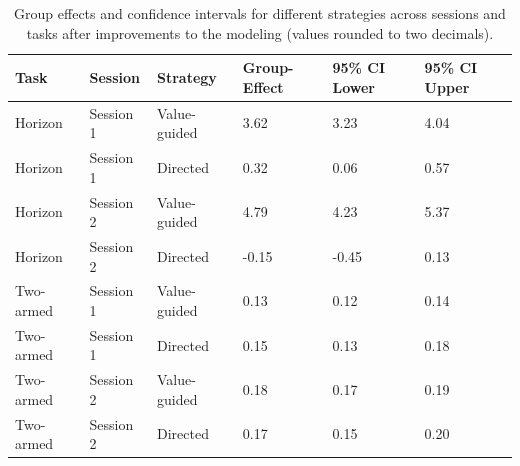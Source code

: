\documentclass[fleqn,10pt]{wlscirep}
\begin{document}
\begin{table}[ht]
\centering
\begin{tabular}{|l|l|l|l|l|l|}
\hline
\textbf{Task} & \textbf{Session} & \textbf{Strategy} & \textbf{Group-Effect} & \textbf{95\% CI Lower} & \textbf{95\% CI Upper} \\ \hline
Horizon & Session 1 & Value-guided & 3.62 & 3.23 & 4.04 \\ \hline
Horizon & Session 1 & Directed & 0.32 & 0.06 & 0.57 \\ \hline
Horizon & Session 2 & Value-guided & 4.79 & 4.23 & 5.37 \\ \hline
Horizon & Session 2 & Directed & -0.15 & -0.45 & 0.13 \\ \hline
Two-armed & Session 1 & Value-guided & 0.13 & 0.12 & 0.14 \\ \hline
Two-armed & Session 1 & Directed & 0.15 & 0.13 & 0.18 \\ \hline
Two-armed & Session 2 & Value-guided & 0.18 & 0.17 & 0.19 \\ \hline
Two-armed & Session 2 & Directed & 0.17 & 0.15 & 0.20 \\ \hline
\end{tabular}
\caption{Group effects and confidence intervals for different strategies across sessions and tasks after improvements to the modeling (values rounded to two decimals).}
\label{tab:group-effects-improved-rounded}
\end{table}
\end{document}
